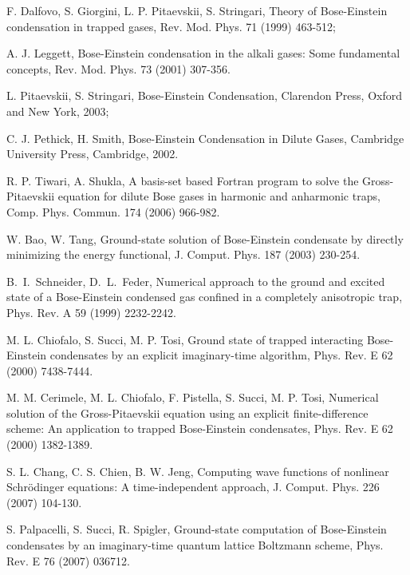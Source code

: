 \documentclass[onecolumn]{elsart3p}
\begin{document}
%
%
\begin{thebibliography}{99}

F. Dalfovo, S. Giorgini, L. P. Pitaevskii, S. Stringari, Theory of
{B}ose-{E}instein condensation in trapped gases, Rev. Mod. Phys. 71
(1999) 463-512;

A. J. Leggett,
Bose-Einstein condensation in the alkali gases: Some fundamental
concepts,
 Rev. Mod. Phys.
 73 (2001) 307-356.

 L. Pitaevskii, S. Stringari,
Bose-Einstein Condensation, Clarendon Press, Oxford and New York, 2003;


 C. J. Pethick, H. Smith,
 Bose-Einstein Condensation in Dilute Gases, Cambridge University Press,
Cambridge, 2002.  	
	

R. P. Tiwari, A. Shukla, {A basis-set based {F}ortran program to solve
the {G}ross-{P}itaevskii equation for dilute {B}ose gases in harmonic
and anharmonic traps}, Comp. Phys. Commun. 174 (2006) 966-982.

W. Bao, W. Tang, {Ground-state solution of {B}ose-{E}instein
condensate by directly minimizing the energy functional}, J. Comput.
Phys. 187 (2003) 230-254.

B.~I.~Schneider,  D.~L.~Feder, {Numerical approach to the ground and
excited state of a {B}ose-{E}instein condensed gas confined in a
completely anisotropic trap}, Phys. Rev. A 59 (1999) 2232-2242.

M. L. Chiofalo, S. Succi,  M. P. Tosi,  Ground state of trapped
interacting Bose-Einstein condensates by an explicit imaginary-time
algorithm, Phys. Rev. E  62 (2000) 7438-7444.

M. M. Cerimele, M. L. Chiofalo, F. Pistella, S. Succi, M. P. Tosi,
Numerical solution of the Gross-Pitaevskii equation using an explicit
finite-difference scheme: An application to trapped Bose-Einstein
condensates, Phys. Rev. E  62 (2000) 1382-1389.

S. L. Chang, C. S. Chien, B. W. Jeng, Computing wave functions of
nonlinear Schr\"odinger equations: A time-independent approach, J.
Comput. Phys. 226 (2007) 104-130.

S. Palpacelli, S. Succi, R. Spigler, Ground-state computation of
Bose-Einstein condensates by an imaginary-time quantum lattice
Boltzmann scheme, Phys. Rev. E 76 (2007)  036712.


\end{thebibliography}
\end{document}
